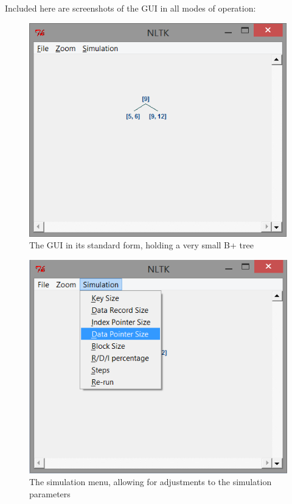 \documentclass[fleqn]{article}
\begin{document}
Included here are screenshots of the GUI in all modes of operation:

\begin{figure}[h!]
\centerline{\includegraphics{Images/gui1.png}}
\caption{The GUI in its standard form, holding a very small B+ tree}
\end{figure}

\begin{figure}[h!]
\centerline{\includegraphics{Images/gui2.png}}
\caption{The simulation menu, allowing for adjustments to the simulation parameters}
\end{figure}
\end{document}
